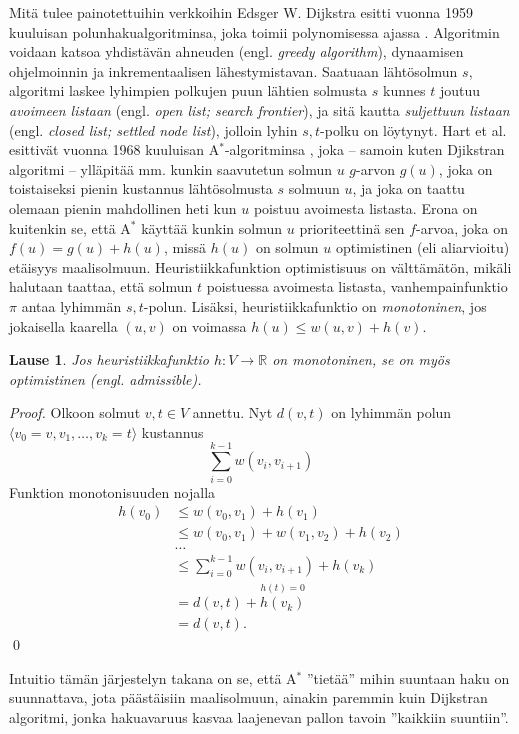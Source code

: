 \documentclass[finnish]{tktltiki2}
\newtheorem{lau}{Lause}
\theoremstyle{definition}
\theoremstyle{remark}
\begin{document}
Mitä tulee painotettuihin verkkoihin Edsger W. Dijkstra esitti vuonna 1959 kuuluisan polunhakualgoritminsa, joka toimii polynomisessa ajassa \cite{Dijkstra59}. Algoritmin voidaan katsoa yhdistävän ahneuden (engl. \textit{greedy algorithm}), dynaamisen ohjelmoinnin ja inkrementaalisen lähestymistavan. Saatuaan lähtösolmun $s$, algoritmi laskee lyhimpien polkujen puun lähtien solmusta $s$ kunnes $t$ joutuu \textit{avoimeen listaan} (engl. \textit{open list; search frontier}), ja sitä kautta \textit{suljettuun listaan} (engl. \textit{closed list; settled node list}), jolloin lyhin $s, t$-polku on löytynyt. Hart et al. esittivät vuonna 1968 kuuluisan A$^{\ast}$-algoritminsa \cite{Hart68},  joka -- samoin kuten Djikstran algoritmi -- ylläpitää mm. kunkin saavutetun solmun $u$ $g$-arvon $g(u)$, joka on toistaiseksi pienin kustannus lähtösolmusta $s$ solmuun $u$, ja joka on taattu olemaan pienin mahdollinen heti kun $u$ poistuu avoimesta listasta. Erona on kuitenkin se, että A$^{\ast}$ käyttää kunkin solmun $u$ prioriteettinä sen $f$-arvoa, joka on $f(u) = g(u) + h(u)$, missä $h(u)$ on solmun $u$ optimistinen (eli aliarvioitu) etäisyys maalisolmuun. Heuristiikkafunktion optimistisuus on välttämätön, mikäli halutaan taattaa, että solmun $t$ poistuessa avoimesta listasta, vanhempainfunktio $\pi$ antaa lyhimmän $s,t$-polun. Lisäksi, heuristiikkafunktio on \textit{monotoninen}, jos jokaisella kaarella $(u, v)$ on voimassa $h(u) \leq w(u, v) + h(v)$.
\begin{lau}
Jos heuristiikkafunktio $h \colon V \to \mathbb{R}$ on monotoninen, se on myös optimistinen (engl. \textit{admissible}).
\end{lau}
\begin{proof}
Olkoon solmut $v, t \in V$ annettu. Nyt $d(v, t)$ on lyhimmän polun $\langle v_0 = v, v_1, \dots, v_k = t \rangle$ kustannus 
\[
\sum_{i = 0}^{k - 1} w(v_i, v_{i + 1})
\]
Funktion monotonisuuden nojalla
\begin{align*}
h(v_0) &\leq w(v_0, v_1) + h(v_1) \\
          &\leq w(v_0, v_1) + w(v_1, v_2) + h(v_2) \\
          &\dots \\
          &\leq \sum_{i = 0}^{k - 1} w(v_i, v_{i + 1}) + h(v_k) \\
          &= d(v, t) + \overset{h(t) = 0}{h(v_k)} \\
          &= d(v, t).
\end{align*}
\qed
\end{proof}
Intuitio tämän järjestelyn takana on se, että A$^{\ast}$ ''tietää'' mihin suuntaan haku on suunnattava, jota päästäisiin maalisolmuun, ainakin paremmin kuin Dijkstran algoritmi, jonka hakuavaruus kasvaa laajenevan pallon tavoin ''kaikkiin suuntiin''. 
\end{document}
